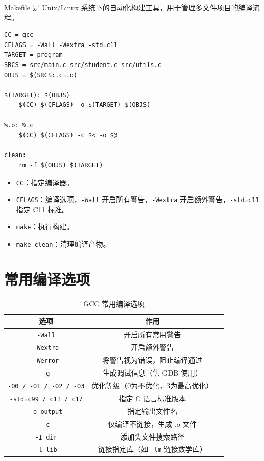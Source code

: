 Makefile 是 Unix/Linux 系统下的自动化构建工具，用于管理多文件项目的编译流程。

\begin{lstlisting}[caption={简单 Makefile 示例}]
CC = gcc
CFLAGS = -Wall -Wextra -std=c11
TARGET = program
SRCS = src/main.c src/student.c src/utils.c
OBJS = $(SRCS:.c=.o)

$(TARGET): $(OBJS)
	$(CC) $(CFLAGS) -o $(TARGET) $(OBJS)

%.o: %.c
	$(CC) $(CFLAGS) -c $< -o $@

clean:
	rm -f $(OBJS) $(TARGET)
\end{lstlisting}

\begin{itemize}
    \item \texttt{CC}：指定编译器。
    \item \texttt{CFLAGS}：编译选项，\texttt{-Wall} 开启所有警告，\texttt{-Wextra} 开启额外警告，\texttt{-std=c11} 指定 C11 标准。
    \item \texttt{make}：执行构建。
    \item \texttt{make clean}：清理编译产物。
\end{itemize}

\section{常用编译选项}

\begin{table}[H]
\centering
\renewcommand{\arraystretch}{1.5}
\begin{tabulary}{\linewidth}{CCC}
\toprule
\textbf{选项} & \textbf{作用} \\ \midrule
\texttt{-Wall} & 开启所有常用警告 \\ 
\texttt{-Wextra} & 开启额外警告 \\ 
\texttt{-Werror} & 将警告视为错误，阻止编译通过 \\ 
\texttt{-g} & 生成调试信息（供 GDB 使用） \\ 
\texttt{-O0 / -O1 / -O2 / -O3} & 优化等级（0为不优化，3为最高优化） \\ 
\texttt{-std=c99 / c11 / c17} & 指定 C 语言标准版本 \\ 
\texttt{-o output} & 指定输出文件名 \\ 
\texttt{-c} & 仅编译不链接，生成 .o 文件 \\ 
\texttt{-I dir} & 添加头文件搜索路径 \\ 
\texttt{-l lib} & 链接指定库（如 \texttt{-lm} 链接数学库） \\ \bottomrule
\end{tabulary}
\caption{GCC 常用编译选项}
\label{tab:gcc_flags}
\end{table}

